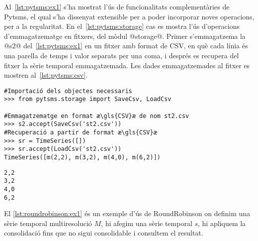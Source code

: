 Al~\autoref{lst:pytsms:ex1} s'ha mostrat l'ús de funcionalitats
complementàries de Pytsms, el qual s'ha dissenyat extensible per a
poder incorporar noves operacions, per a la regularitat.  En
el~\autoref{lst:pytsms:storage} cas es mostra l'ús d'operacions
d'emmagatzematge en fitxers, del mòdul @storage@. Primer s'emmagatzema
la @s2@ del~\autoref{lst:pytsms:ex1} en un fitxer amb format de
\gls{CSV}, en què cada línia és una parella de temps i valor separats
per una coma, i després es recupera del fitxer la sèrie temporal
emmagatzemada. Les dades emmagatzemades al fitxer es mostren
al~\autoref{lst:pytsms:csv}.
\begin{lstlisting}[style=py,caption=Operacions complementàries de Pytsms per a l'emmagatzematge,label=lst:pytsms:storage]
#Importació dels objectes necessaris
>>> from pytsms.storage import SaveCsv, LoadCsv

#Emmagatzematge en format æ\gls{CSV}æ de nom st2.csv
>>> s2.accept(SaveCsv('st2.csv'))
#Recuperació a partir de format æ\gls{CSV}æ
>>> sr = TimeSeries([])
>>> sr.accept(LoadCsv('st2.csv'))
TimeSeries([m(2,2), m(3,2), m(4,0), m(6,2)])
\end{lstlisting}

\begin{lstlisting}[style=file,caption=Dades del fitxer st2.csv,label=lst:pytsms:csv]
2,2
3,2
4,0
6,2
\end{lstlisting}








El \autoref{lst:roundrobinson:ex1} és un exemple d'ús de RoundRobinson
on definim una sèrie temporal multiresolució $M$, hi afegim una sèrie
temporal $s$, hi apliquem la consolidació fins que no sigui
consolidable i consultem el resultat.

